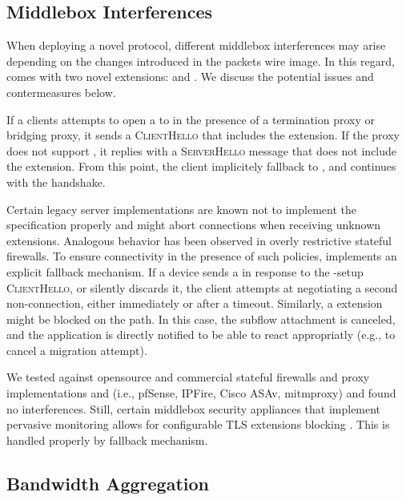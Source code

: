 \subsection{Middlebox Interferences}

When deploying a novel protocol, different middlebox interferences may arise
depending on the changes introduced in the packets wire image. In this
regard, \tcpls comes with two novel \tls extensions: \tcpls and \join.
We discuss the potential issues and contermeasures below.

If a clients attempts to open a \tcpls to in the presence of a \tls termination
proxy or bridging proxy, it sends a \textsc{ClientHello} that includes
the \tcpls extension.
If the proxy does not support \tcpls, it replies with a \textsc{ServerHello}
message that does not include the \tcpls extension. From this point, the client
implicitely fallback to \tls, and continues with the handshake.

Certain legacy \tls server implementations are known not to implement the \tls
specification properly and might abort connections when receiving unknown \tls
extensions. Analogous behavior has been observed in overly restrictive stateful
firewalls.  To ensure connectivity in the presence of such policies, \tcpls
implements an explicit fallback mechanism. If a device sends a \tcp \rst in
response to the \tcpls-setup \textsc{ClientHello}, or silently discards it,
the client attempts at negotiating a second non-\tcpls \tls connection, either
immediately or after a timeout. Similarly, a \tcpls \join extension might be
blocked on the path. In this case, the subflow attachment is canceled, and
the application is directly notified to be able to react appropriatly (e.g.,
to cancel a migration attempt).

We tested \tcpls against opensource and commercial stateful firewalls and proxy
implementations and (i.e., pfSense, IPFire, Cisco ASAv, mitmproxy) and found no
interferences. Still, certain middlebox security appliances that implement
pervasive monitoring allows for configurable TLS extensions blocking
\cite{rfc7258}. This is handled properly by \tcpls fallback mechanism.


\subsection{Bandwidth Aggregation}

